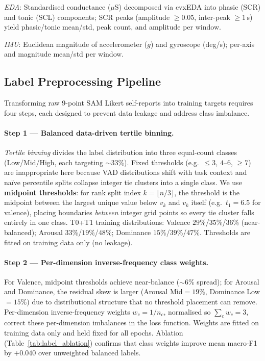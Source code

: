 \documentclass[sigconf,nonacm]{acmart}
\begin{document}
\textit{EDA}: Standardised conductance ($\mu$S) decomposed via cvxEDA
\cite{greco2016cvxeda} into phasic (SCR) and tonic (SCL) components;
SCR peaks (amplitude $\geq 0.05$, inter-peak $\geq 1$\,s) yield
phasic/tonic mean/std, peak count, and amplitude per window.

\textit{IMU}: Euclidean magnitude of accelerometer ($g$) and gyroscope
(deg/s); per-axis and magnitude mean/std per window.

\subsection{Label Preprocessing Pipeline}
\label{sec:labelpreproc}

Transforming raw 9-point SAM Likert self-reports into training targets
requires four steps, each designed to prevent data leakage and address
class imbalance.

\paragraph{Step 1 --- Balanced data-driven tertile binning.}
\emph{Tertile binning} divides the label distribution into three equal-count
classes (Low/Mid/High, each targeting $\sim$33\%).
Fixed thresholds (e.g.\ $\leq3$, $4$--$6$, $\geq7$) are inappropriate here
because VAD distributions shift with task context and naïve percentile splits
collapse integer tie clusters into a single class.
We use \textbf{midpoint thresholds}: for rank split index
$k = \lfloor n/3 \rfloor$, the threshold is the midpoint between the largest
unique value below $v_k$ and $v_k$ itself (e.g.\ $t_1{=}6.5$ for valence),
placing boundaries \emph{between} integer grid points so every tie cluster
falls entirely in one class.
T0+T1 training distributions:
Valence $29$\%/$35$\%/$36$\% (near-balanced);
Arousal $33$\%/$19$\%/$48$\%;
Dominance $15$\%/$39$\%/$47$\%.
Thresholds are fitted on training data only (no leakage).

\paragraph{Step 2 --- Per-dimension inverse-frequency class weights.}
For Valence, midpoint thresholds achieve near-balance ($\sim\!6\%$ spread);
for Arousal and Dominance, the residual skew is larger (Arousal Mid$=19\%$,
Dominance Low$=15\%$) due to distributional structure that no threshold
placement can remove.
Per-dimension inverse-frequency weights $w_c = 1/n_c$, normalised so
$\sum_c w_c = 3$, correct these per-dimension imbalances in the loss function.
Weights are fitted on training data only and held fixed for all epochs.
Ablation (Table~\ref{tab:label_ablation}) confirms that class weights
improve mean macro-F1 by $+0.040$ over unweighted balanced labels.
\end{document}
